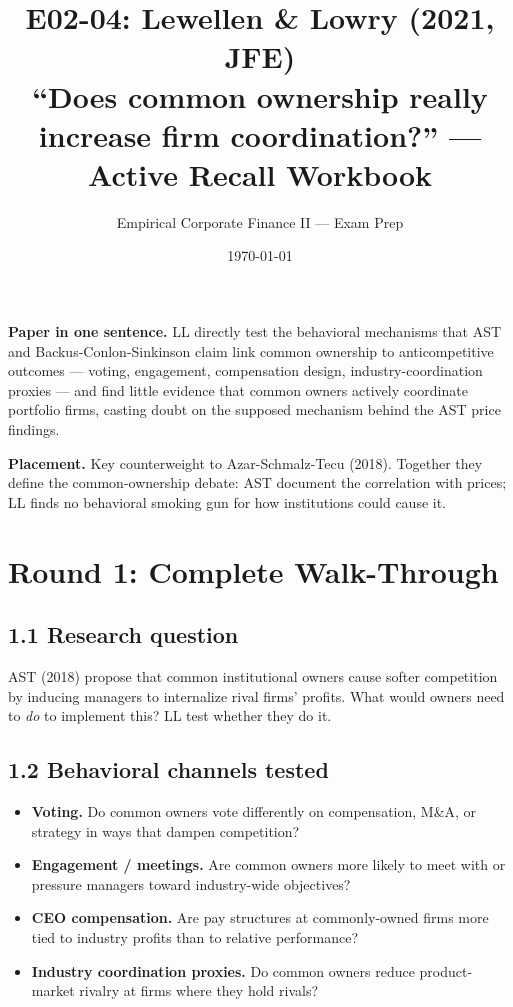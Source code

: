 \documentclass[11pt]{article}
\title{E02-04: Lewellen \& Lowry (2021, JFE) \\
\large ``Does common ownership really increase firm coordination?'' --- Active Recall Workbook}
\author{Empirical Corporate Finance II --- Exam Prep}
\date{\today}
\begin{document}
\maketitle

\begin{keybox}
\textbf{Paper in one sentence.} LL directly test the behavioral mechanisms that AST and Backus-Conlon-Sinkinson claim link common ownership to anticompetitive outcomes --- voting, engagement, compensation design, industry-coordination proxies --- and find little evidence that common owners actively coordinate portfolio firms, casting doubt on the supposed mechanism behind the AST price findings.

\textbf{Placement.} Key counterweight to Azar-Schmalz-Tecu (2018). Together they define the common-ownership debate: AST document the correlation with prices; LL finds no behavioral smoking gun for how institutions could cause it.
\end{keybox}

\section*{Round 1: Complete Walk-Through}

\subsection*{1.1 Research question}
AST (2018) propose that common institutional owners cause softer competition by inducing managers to internalize rival firms' profits. What would owners need to \emph{do} to implement this? LL test whether they do it.

\subsection*{1.2 Behavioral channels tested}
\begin{itemize}
\item \textbf{Voting.} Do common owners vote differently on compensation, M\&A, or strategy in ways that dampen competition?
\item \textbf{Engagement / meetings.} Are common owners more likely to meet with or pressure managers toward industry-wide objectives?
\item \textbf{CEO compensation.} Are pay structures at commonly-owned firms more tied to industry profits than to relative performance?
\item \textbf{Industry coordination proxies.} Do common owners reduce product-market rivalry at firms where they hold rivals?
\end{itemize}
\end{document}
